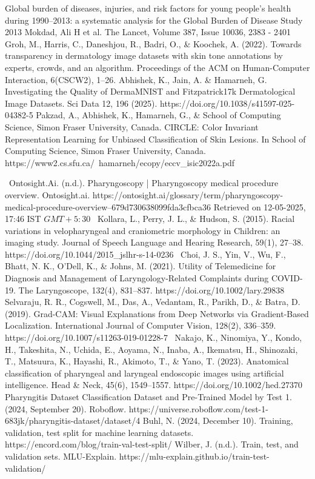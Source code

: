 \begin{thebibliography}{}
Global burden of diseases, injuries, and risk factors for young people's health during 1990–2013: a systematic analysis for the Global Burden of Disease Study 2013
Mokdad, Ali H et al.
The Lancet, Volume 387, Issue 10036, 2383 - 2401
Groh, M., Harris, C., Daneshjou, R., Badri, O., \& Koochek, A. (2022). Towards transparency in dermatology image datasets with skin tone annotations by experts, crowds, and an algorithm. Proceedings of the ACM on Human-Computer Interaction, 6(CSCW2), 1–26.
Abhishek, K., Jain, A. \& Hamarneh, G. Investigating the Quality of DermaMNIST and Fitzpatrick17k Dermatological Image Datasets. Sci Data 12, 196 (2025). https://doi.org/10.1038/s41597-025-04382-5
Pakzad, A., Abhishek, K., Hamarneh, G., \& School of Computing Science, Simon Fraser University, Canada. CIRCLE: Color Invariant Representation Learning for Unbiased Classification of Skin Lesions. In School of Computing Science, Simon Fraser University, Canada. https://www2.cs.sfu.ca/~hamarneh/ecopy/eccv\_isic2022a.pdf


~Ontosight.Ai. (n.d.). Pharyngoscopy | Pharyngoscopy medical procedure overview. Ontosight.ai. https://ontosight.ai/glossary/term/pharyngoscopy-medical-procedure-overview--679d730638099fda3cfbca36 Retrieved on 12-05-2025, 17:46 IST \(GMT +5:30\)
~Kollara, L., Perry, J. L., \& Hudson, S. (2015). Racial variations in velopharyngeal and craniometric morphology in Children: an imaging study. Journal of Speech Language and Hearing Research, 59(1), 27–38. https://doi.org/10.1044/2015\_jslhr-s-14-0236
~Choi, J. S., Yin, V., Wu, F., Bhatt, N. K., O’Dell, K., \& Johns, M. (2021). Utility of Telemedicine for Diagnosis and Management of Laryngology‐Related Complaints during COVID‐19. The Laryngoscope, 132(4), 831–837. https://doi.org/10.1002/lary.29838
Selvaraju, R. R., Cogswell, M., Das, A., Vedantam, R., Parikh, D., \& Batra, D. (2019). Grad-CAM: Visual Explanations from Deep Networks via Gradient-Based Localization. International Journal of Computer Vision, 128(2), 336–359. https://doi.org/10.1007/s11263-019-01228-7
~Nakajo, K., Ninomiya, Y., Kondo, H., Takeshita, N., Uchida, E., Aoyama, N., Inaba, A., Ikematsu, H., Shinozaki, T., Matsuura, K., Hayashi, R., Akimoto, T., \& Yano, T. (2023). Anatomical classification of pharyngeal and laryngeal endoscopic images using artificial intelligence. Head \& Neck, 45(6), 1549–1557. https://doi.org/10.1002/hed.27370
Pharyngitis Dataset Classification Dataset and Pre-Trained Model by Test 1. (2024, September 20). Roboflow. https://universe.roboflow.com/test-1-683jk/pharyngitis-dataset/dataset/4
Buhl, N. (2024, December 10). Training, validation, test split for machine learning datasets. https://encord.com/blog/train-val-test-split/
Wilber, J. (n.d.). Train, test, and validation sets. MLU-Explain. https://mlu-explain.github.io/train-test-validation/


\end{thebibliography}
